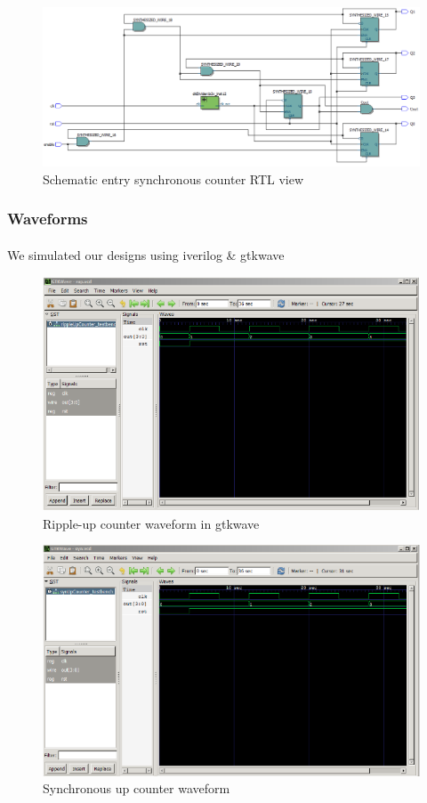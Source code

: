 \documentclass{article}
\begin{document}
		\begin{figure}[H]
		  \centering
		  \includegraphics[width=0.75\linewidth]{figures/RTLs/schem_synUp_RTL.png}
		  \caption{Schematic entry synchronous counter RTL view}
		  \label{fig:schem_synUp_RTL}
		\end{figure}


	\subsubsection{Waveforms}
		\paragraph{} We simulated our designs using iverilog \& gtkwave

		\begin{figure}[H]
		  \centering
		  \includegraphics[width=0.75\linewidth]{figures/waveforms/rippleUp_wave.png}
		  \caption{Ripple-up counter waveform in gtkwave}
		  \label{fig:rippleUp_waveform}
		\end{figure}

		\begin{figure}[H]
		  \centering
		  \includegraphics[width=0.75\linewidth]{figures/waveforms/synUp_wave.png}
		  \caption{Synchronous up counter waveform}
		  \label{fig:synUp_waveform}
		\end{figure}
\end{document}
